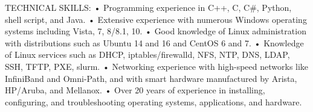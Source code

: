 
TECHNICAL SKILLS:
•	Programming experience in C++, C, C#, Python, shell script, and Java.
•	Extensive experience with numerous Windows operating systems including Vista, 7, 8/8.1, 10.
•	Good knowledge of Linux administration with distributions such as Ubuntu 14 and 16 and CentOS 6 and 7.
•	Knowledge of Linux services such as DHCP, iptables/firewalld, NFS, NTP, DNS, LDAP, SSH, TFTP, PXE, slurm.
•	Networking experience with high-speed networks like InfiniBand and Omni-Path, and with smart hardware manufactured by Arista, HP/Aruba, and Mellanox.
•	Over 20 years of experience in installing, configuring, and troubleshooting operating systems, applications, and hardware.

